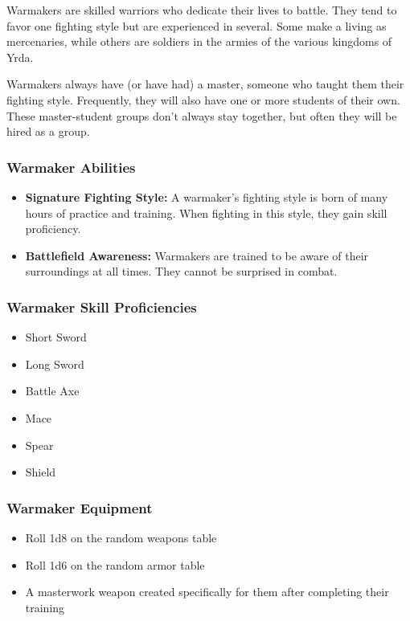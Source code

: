 \begin{multicols}{2}
Warmakers are skilled warriors who dedicate their lives to battle. They
tend to favor one fighting style but are experienced in several. Some
make a living as mercenaries, while others are soldiers in the armies
of the various kingdoms of Yrda.

Warmakers always have (or have had) a master, someone who taught them
their fighting style. Frequently, they will also have one or more students
of their own. These master-student groups don't always stay together, but
often they will be hired as a group.

\subsubsection{Warmaker Abilities}

\begin{itemize}
  \item \textbf{Signature Fighting Style:} A warmaker's fighting style is
    born of many hours of practice and training. When fighting in this style,
    they gain skill proficiency.
  \item \textbf{Battlefield Awareness:} Warmakers are trained to be aware of
    their surroundings at all times. They cannot be surprised in combat.
\end{itemize}

\subsubsection{Warmaker Skill Proficiencies}

\begin{itemize}
  \item Short Sword
  \item Long Sword
  \item Battle Axe
  \item Mace
  \item Spear
  \item Shield
\end{itemize}

\subsubsection{Warmaker Equipment}

\begin{itemize}
  \item Roll 1d8 on the random weapons table
  \item Roll 1d6 on the random armor table
  \item A masterwork weapon created specifically for them after completing their training
\end{itemize}

\end{multicols}
